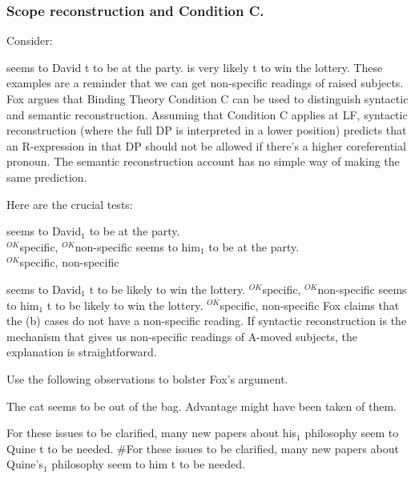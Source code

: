 \subsubsection{Scope reconstruction and Condition C.}

Consider:

\pex
\a{} seems to David t to be at the party.
\a{} is very likely t to win the lottery.
\xe
%
These examples are a reminder that we can get non-specific readings of raised
subjects. Fox argues that Binding Theory Condition C can be used to distinguish
syntactic and semantic reconstruction. Assuming that Condition C applies at LF,
syntactic reconstruction (where the full DP is interpreted in a lower position)
predicts that an R-expression in that DP should not be allowed if there's a
higher coreferential pronoun. The semantic reconstruction account has no simple
way of making the same prediction.

Here are the crucial tests:

\pex
\a{} seems to David$_1$ to be at the party.\\
\null\hfill $^{OK}$specific, $^{OK}$non-specific 
\a{} seems to him$_{1}$ to be at the party.\\
\null\hfill $^{OK}$specific, {\small *}non-specific
\xe

\pex
\a{} seems to David$_1$ t to be likely to win the
lottery.
\null\hfill $^{OK}$specific, $^{OK}$non-specific
\a{} seems to him$_1$ t to be likely to win the
lottery.
\null\hfill $^{OK}$specific, {\small *}non-specific
\xe
%
Fox claims that the (b) cases do not have a non-specific reading. If syntactic
reconstruction is the mechanism that gives us non-specific readings of A-moved
subjects, the explanation is straightforward.

\begin{exercise}
  Use the following observations to bolster Fox's argument.

  \pex
  \a The cat seems to be out of the bag.
  \a Advantage might have been taken of them.
  \xe

  \pex
  \a For these issues to be clarified, many new papers about his$_1$ philosophy
  seem to Quine t to be needed.
  \a \#For these issues to be clarified, many new papers about Quine's$_1$ philosophy
  seem to him t to be needed. \hfill\eex
  \xe
  
\end{exercise}

